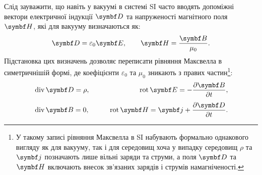 \documentclass{ConspectBook}
\begin{document}
Слід зауважити, що навіть у вакуумі в системі SI часто вводять допоміжні вектори електричної індукції \(\Dfield\) та напруженості магнітного поля \(\Hfield\), які для вакууму визначаються як:
\begin{equation*}
	\Dfield = \varepsilon_0 \Efield, \qquad \Hfield = \frac{\Bfield}{\mu_0}.
\end{equation*}
Підстановка цих визначень дозволяє переписати рівняння Максвелла в симетричнішій формі, де коефіцієнти \(\varepsilon_0\) та \(\mu_0\) зникають з правих частин\footnote{У такому записі рівняння Максвелла в SI набувають формально однакового вигляду як для вакууму, так і для середовищ хоча у випадку середовищ \(\rho\) та \(\vect{j}\) позначають лише вільні заряди та струми, а поля \(\Dfield\) та \(\Hfield\) включають внесок зв'язаних зарядів і струмів намагніченості.}:
\begin{equation*}
	\begin{aligned}
		 & \Div\Dfield = \rho, \qquad
		 & \Rot\Efield = -\frac{\partial \Bfield}{\partial t},           \\[4pt]
		 & \Div\Bfield = 0, \qquad
		 & \Rot\Hfield = \vect{j} + \frac{\partial \Dfield}{\partial t}.
	\end{aligned}
\end{equation*}
\end{document}
